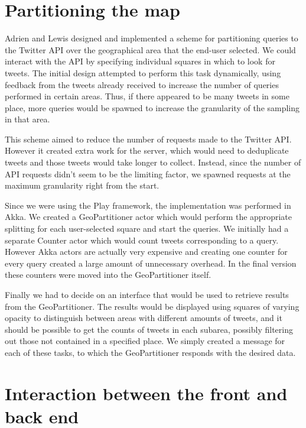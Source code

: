\section{Partitioning the map}
\label{sec:partitioning}

Adrien and Lewis designed and implemented a scheme for partitioning queries to
the Twitter API over the geographical area that the end-user selected. We could
interact with the API by specifying individual squares in which to look for
tweets. The initial design attempted to perform this task dynamically, using
feedback from the tweets already received to increase the number of queries
performed in certain areas. Thus, if there appeared to be many tweets in some
place, more queries would be spawned to increase the granularity of the
sampling in that area.

This scheme aimed to reduce the number of requests made to the Twitter API.
However it created extra work for the server, which would need to deduplicate
tweets and those tweets would take longer to collect. Instead, since the number
of API requests didn't seem to be the limiting factor, we spawned requests
at the maximum granularity right from the start.

Since we were using the Play framework, the implementation was performed in
Akka. We created a GeoPartitioner actor which would perform the appropriate
splitting for each user-selected square and start the queries. We initially had
a separate Counter actor which would count tweets corresponding to a query.
However Akka actors are actually very expensive and creating one counter for
every query created a large amount of unnecessary overhead. In the final
version these counters were moved into the GeoPartitioner itself.

Finally we had to decide on an interface that would be used to retrieve results
from the GeoPartitioner. The results would be displayed using squares of
varying opacity to distinguish between areas with different amounts of tweets,
and it should be possible to get the counts of tweets in each subarea, possibly
filtering out those not contained in a specified place. We simply created a
message for each of these tasks, to which the GeoPartitioner responds with the
desired data.

\section{Interaction between the front and back end}
\label{sec:task_controller}

